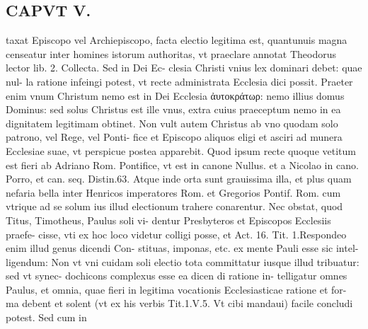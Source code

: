 \documentclass{article}
\begin{document}
\begin{pages}
\section*{CAPVT  V. }
\marginpar{[ p.347 ]}\pstart taxat Episcopo vel Archiepiscopo, facta electio legitima est, quantunuis magna censeatur inter homines istorum authoritas, vt praeclare annotat Theodorus lector lib. 2. Collecta. Sed in Dei Ec- clesia Christi vnius lex dominari debet: quae nul- la ratione infeingi potest, vt recte administrata Ecclesia dici possit. Praeter enim vnum Christum nemo est in Dei Ecclesia ἀυτοκράτωρ: nemo illius domus Dominus: sed solus Christus est ille vnus, extra cuius praeceptum nemo in ea dignitatem legitimam obtinet. Non vult autem Christus ab vno quodam solo patrono, vel Rege, vel Ponti- fice et Episcopo aliquos eligi et asciri ad munera Ecclesiae suae, vt perspicue postea apparebit. Quod ipsum recte quoque vetitum est fieri ab Adriano Rom. Pontifice, vt est in canone Nullus. et a Nicolao in cano. Porro, et can. seq. Distin.63. Atque inde orta sunt grauissima illa, et plus quam nefaria bella inter Henricos imperatores Rom. et Gregorios Pontif. Rom. cum vtrique ad se solum ius illud electionum trahere conarentur. Nec obstat, quod Titus, Timotheus, Paulus soli vi- dentur Presbyteros et Episcopos Ecclesiis praefe- cisse, vti ex hoc loco videtur colligi posse, et Act. 16. Tit. 1.Respondeo enim illud genus dicendi Con- stituas, imponas, etc. ex mente Pauli esse sic intel- ligendum: Non vt vni cuidam soli electio tota committatur iusque illud tribuatur: sed vt synec- dochicons complexus esse ea dicen di ratione in- telligatur omnes Paulus, et omnia, quae fieri in legitima vocationis Ecclesiasticae ratione et for- ma debent et solent (vt ex his verbis Tit.1.V.5. Vt cibi mandaui) facile concludi potest. Sed cum in  \pend

\end{pages}
\end{document}
